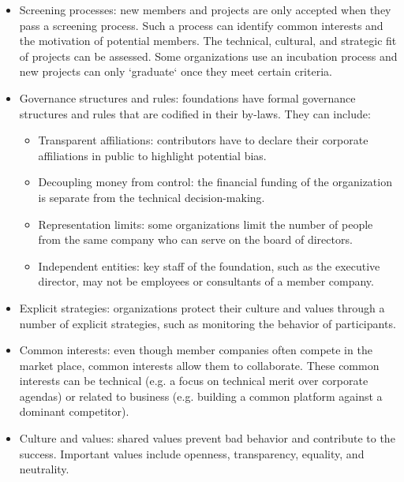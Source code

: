 \begin{itemize}

\itemsep 1em

\item Screening processes: new members and projects are only accepted when they pass a screening process.  Such a process can identify common interests and the motivation of potential members.  The technical, cultural, and strategic fit of projects can be assessed.  Some organizations use an incubation process and new projects can only `graduate` once they meet certain criteria.

\item Governance structures and rules: foundations have formal governance structures and rules that are codified in their by-laws.  They can include:

\begin{itemize}

\itemsep 0.50em

\item Transparent affiliations: contributors have to declare their corporate affiliations in public to highlight potential bias.

\item Decoupling money from control: the financial funding of the organization is separate from the technical decision-making.

\item Representation limits: some organizations limit the number of people from the same company who can serve on the board of directors.

\item Independent entities: key staff of the foundation, such as the executive director, may not be employees or consultants of a member company.

\end{itemize}

\item Explicit strategies: organizations protect their culture and values through a number of explicit strategies, such as monitoring the behavior of participants.

\item Common interests: even though member companies often compete in the market place, common interests allow them to collaborate.  These common interests can be technical (e.g. a focus on technical merit over corporate agendas) or related to business (e.g. building a common platform against a dominant competitor).

\item Culture and values: shared values prevent bad behavior and contribute to the success.  Important values include openness, transparency, equality, and neutrality.

\end{itemize}

